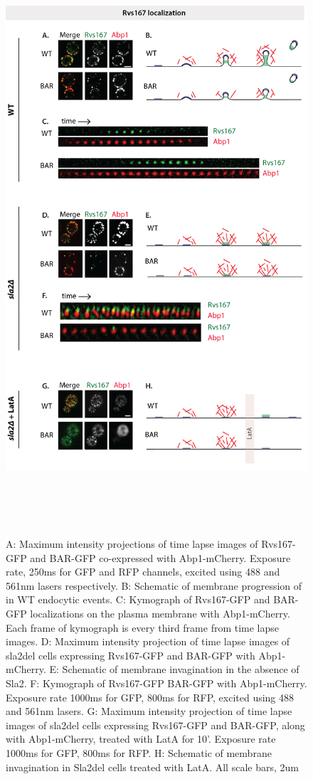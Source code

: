 \begin{figure}
	\centering
	\includegraphics[width=22cm,height=22cm,keepaspectratio]{figures/results_final/sla2_del_final6}
	\caption [Localization of Rvs167 and BAR with and without membrane curvature]
	{A: Maximum intensity projections of time lapse images of Rvs167-GFP and BAR-GFP co-expressed with Abp1-mCherry. Exposure rate, 250ms for GFP and RFP channels, excited using 488 and 561nm lasers respectively. B: Schematic of membrane progression of in WT endocytic events. C: Kymograph of Rvs167-GFP and BAR-GFP localizations on the plasma membrane with Abp1-mCherry. Each frame of kymograph is every third frame from time lapse images. 
D: Maximum intensity projection of time lapse images of sla2del cells expressing Rvs167-GFP and BAR-GFP with Abp1-mCherry. E: Schematic of membrane invagination in the absence of Sla2. F: Kymograph of Rvs167-GFP BAR-GFP with Abp1-mCherry. Exposure rate 1000ms for GFP, 800ms for RFP, excited using 488 and 561nm lasers. 
G: Maximum intensity projection of time lapse images of sla2del cells expressing Rvs167-GFP and BAR-GFP, along with Abp1-mCherry, treated with LatA for 10’. Exposure rate 1000ms for GFP, 800ms for RFP. H: Schematic of membrane invagination in Sla2del cells treated with LatA. All scale bars, 2um\label{fig2_sla2del}}
\end{figure}

